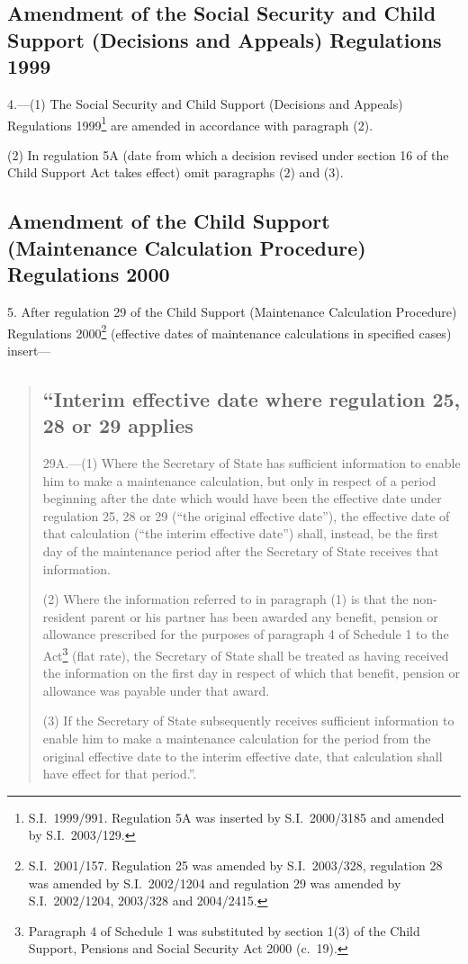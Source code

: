 \documentclass[12pt,a4paper]{article}
\begin{document}
\subsection[4. Amendment of the Social Security and Child Support (Decisions and Appeals) Regulations 1999]{Amendment of the Social Security and Child Support (Decisions and Appeals) Regulations 1999}

4.---(1)  The Social Security and Child Support (Decisions and Appeals) Regulations 1999\footnote{S.I.\ 1999/991. Regulation 5A was inserted by S.I.\ 2000/3185 and amended by S.I.\ 2003/129.} are amended in accordance with paragraph (2).

(2) In regulation 5A (date from which a decision revised under section 16 of the Child Support Act takes effect) omit paragraphs (2) and (3).

\subsection[5. Amendment of the Child Support (Maintenance Calculation Procedure) Regulations 2000]{Amendment of the Child Support (Maintenance Calculation Procedure) Regulations 2000}

5.  After regulation 29 of the Child Support (Maintenance Calculation Procedure) Regulations 2000\footnote{S.I.\ 2001/157. Regulation 25 was amended by S.I.\ 2003/328, regulation 28 was amended by S.I.\ 2002/1204 and regulation 29 was amended by S.I.\ 2002/1204, 2003/328 and 2004/2415.} (effective dates of maintenance calculations in specified cases) insert—
\begin{quotation}
\subsection*{“Interim effective date where regulation 25, 28 or 29 applies}

29A.---(1)  Where the Secretary of State has sufficient information to enable him to make a maintenance calculation, but only in respect of a period beginning after the date which would have been the effective date under regulation 25, 28 or 29 (“the original effective date”), the effective date of that calculation (“the interim effective date”) shall, instead, be the first day of the maintenance period after the Secretary of State receives that information.

(2) Where the information referred to in paragraph (1) is that the non-resident parent or his partner has been awarded any benefit, pension or allowance prescribed for the purposes of paragraph 4 of Schedule 1 to the Act\footnote{Paragraph 4 of Schedule 1 was substituted by section 1(3) of the Child Support, Pensions and Social Security Act 2000 (c.\ 19).} (flat rate), the Secretary of State shall be treated as having received the information on the first day in respect of which that benefit, pension or allowance was payable under that award.

(3) If the Secretary of State subsequently receives sufficient information to enable him to make a maintenance calculation for the period from the original effective date to the interim effective date, that calculation shall have effect for that period.”.
\end{quotation}
\end{document}
